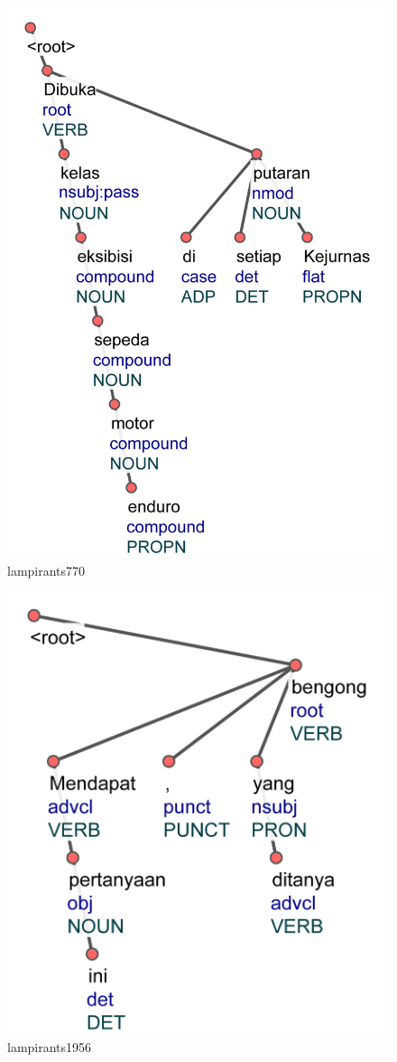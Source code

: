 
\begin{figure}
	\centering \includegraphics[width=0.8
	\textwidth] {pics/lampiran/lampirants770.jpg} 
	\caption{lampirants770} 
	\label{fig:lampirants770} 
\end{figure}

\begin{figure}
	\centering \includegraphics[width=0.8
	\textwidth] {pics/lampiran/lampirants1956.jpg} 
	\caption{lampirants1956} 
	\label{fig:lampirants1956} 
\end{figure}

